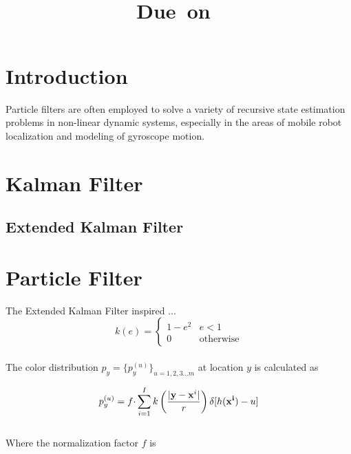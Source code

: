 \documentclass[12pt]{article}
\title{
  \vspace{2in}
  \textmd{\textbf{\hmwkTitle}} \\
  \vspace{0.1in}
  \large{\textmd{\hmwkClassInstructor}} \\
  \vspace{0.1in}
  \normalsize\small{Due\ on\ \hmwkDueDate} \\
  \vspace{3in}
}
\date{} %
\author{\textbf{\hmwkAuthorName}}
\begin{document}
\maketitle
\thispagestyle{empty}

\newpage %

\section{Introduction}

Particle filters are often employed to solve a variety of recursive state estimation problems in non-linear dynamic systems, especially in the areas of mobile robot localization and modeling of gyroscope motion.

\section{Kalman Filter}

\subsection{Extended Kalman Filter}


\section{Particle Filter}
\label{sec:particlefilter}

The Extended Kalman Filter inspired ...  \\

\begin{equation}
k(e) = \begin{cases}
 1 - e^2  & \text{$e < 1$} \\
 0            & \text{otherwise}
\end{cases}
\label{eq:kdist}
\end{equation} \\

The color distribution $p_y = \{p_y^{(u)}\}_{u = 1,2,3 \dots m}$ at location $y$ is calculated as

\begin{equation}
p_y^{(u)} = f \cdotp \sum^I_{i=1} k \left ( \frac{| {\bf y} - {\bf x}^i|}{r} \right ) \delta [h({\bf x^i})-u]
\label{eq:cdist}
\end{equation} \\

Where the normalization factor $f$ is
\end{document}
